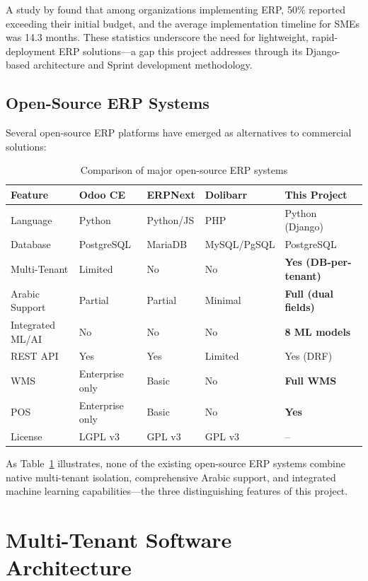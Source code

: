 \documentclass[12pt,a4paper]{report}
\begin{document}
A study by \citet{panorama2023} found that among organizations implementing ERP, 50\% reported exceeding their initial budget, and the average implementation timeline for SMEs was 14.3 months. These statistics underscore the need for lightweight, rapid-deployment ERP solutions---a gap this project addresses through its Django-based architecture and Sprint development methodology.

\subsection{Open-Source ERP Systems}

Several open-source ERP platforms have emerged as alternatives to commercial solutions:

\begin{table}[H]
\centering
\caption{Comparison of major open-source ERP systems}
\label{tab:erp_comparison}
\begin{tabularx}{\textwidth}{l X X X X}
\toprule
\textbf{Feature} & \textbf{Odoo CE} & \textbf{ERPNext} & \textbf{Dolibarr} & \textbf{This Project} \\
\midrule
Language & Python & Python/JS & PHP & Python (Django) \\
Database & PostgreSQL & MariaDB & MySQL/PgSQL & PostgreSQL \\
Multi-Tenant & Limited & No & No & \textbf{Yes (DB-per-tenant)} \\
Arabic Support & Partial & Partial & Minimal & \textbf{Full (dual fields)} \\
Integrated ML/AI & No & No & No & \textbf{8 ML models} \\
REST API & Yes & Yes & Limited & Yes (DRF) \\
WMS & Enterprise only & Basic & No & \textbf{Full WMS} \\
POS & Enterprise only & Basic & No & \textbf{Yes} \\
License & LGPL v3 & GPL v3 & GPL v3 & -- \\
\bottomrule
\end{tabularx}
\end{table}

As Table~\ref{tab:erp_comparison} illustrates, none of the existing open-source ERP systems combine native multi-tenant isolation, comprehensive Arabic support, and integrated machine learning capabilities---the three distinguishing features of this project.


\section{Multi-Tenant Software Architecture}
\label{sec:multi_tenant}
\end{document}
